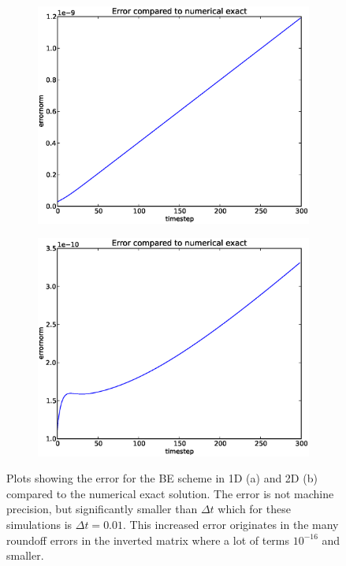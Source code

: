 \begin{figure}[H]
 \centering
 \begin{subfigure}{0.49\textwidth}
 \includegraphics[width=\textwidth]{../results/experiment_14042014_0759_BE1D_numerical_exact/results/numerical_exact.eps}
 \caption{}
\end{subfigure}
\begin{subfigure}{0.49\textwidth}
 \includegraphics[width=\textwidth]{../results/experiment_30042014_0914_BE2D_numex/results/numerical_exact.eps}
 \caption{}
\end{subfigure}
 \caption[Numerical exact errorplots for BE scheme]{Plots showing the error for the BE scheme in 1D (a) and 2D (b) compared to the numerical exact solution. 
 The error is not machine precision, but significantly smaller than $\Delta t$ which for these simulations is $\Delta t=0.01$. 
 This increased error originates in the many roundoff errors in the inverted matrix where a lot of terms $10^{-16}$ and smaller.}
 \label{numex:BE_errorplot}
\end{figure}

